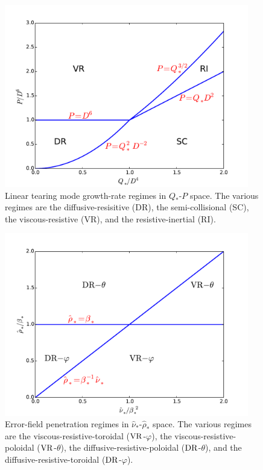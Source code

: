 \documentclass[12pt,prb,aps]{revtex4-1}
\begin{document}
\begin{figure}
\centerline{\includegraphics[width=0.95\textwidth]{Figure3.pdf}}
\caption{Linear tearing mode growth-rate regimes  in $Q_\ast$-$P$ space. The various regimes are
the diffusive-resisitive (DR), the semi-collisional (SC),  the viscous-resistive (VR), and the resistive-inertial (RI).}\label{f3}
\end{figure}

\begin{figure}
\centerline{\includegraphics[width=0.95\textwidth]{Figure4.pdf}}
\caption{Error-field penetration regimes in $\hat{\nu}_\ast$-$\hat{\rho}_\ast$ space. The various regimes are the
viscous-resistive-toroidal (${\rm VR}$-$\varphi$), the viscous-resistive-poloidal (${\rm VR}$-$\theta$), the diffusive-resistive-poloidal (${\rm DR}$-$\theta$), and the  diffusive-resistive-toroidal (${\rm DR}$-$\varphi$). }\label{f6}
\end{figure}
\end{document}

